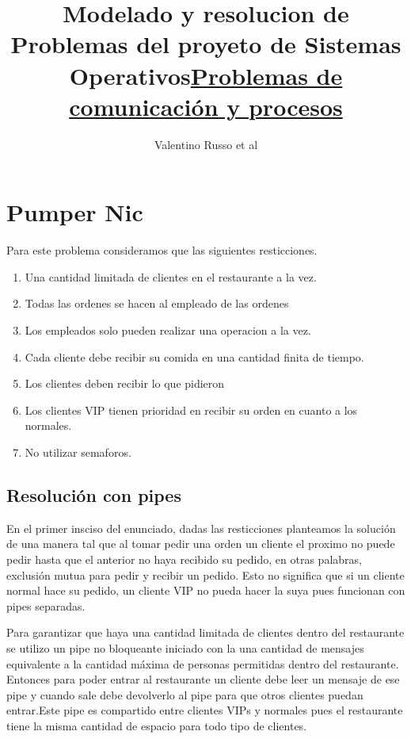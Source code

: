 \documentclass[11pt]{article} %
\title{\huge Modelado y resolucion de Problemas del proyeto de Sistemas Operativos}
\author{Valentino Russo et al}
\date{} %
\begin{document}
\maketitle

\hfill \break
\title{\huge \underline {Problemas de comunicación y procesos}}

\section{Pumper Nic}

Para este problema consideramos que las siguientes resticciones.
\begin{enumerate}
    \item Una cantidad limitada de clientes en el restaurante a la vez.
    \item Todas las ordenes se hacen al empleado de las ordenes
    \item Los empleados solo pueden realizar una operacion a la vez.
    \item Cada cliente debe recibir su comida en una cantidad finita de tiempo.
    \item Los clientes deben recibir lo que pidieron
    \item Los clientes VIP tienen prioridad en recibir su orden en cuanto a los normales.
    \item No utilizar semaforos.
\end{enumerate}
\subsection{Resolución con pipes}
    En el primer insciso del enunciado, dadas las resticciones planteamos la solución de una manera tal que al tomar pedir una orden un cliente el proximo no puede pedir hasta que el anterior no haya recibido su pedido, en otras palabras, exclusión mutua para pedir y recibir un pedido. Esto no significa que si un cliente normal hace su pedido, un cliente VIP no pueda hacer la suya pues funcionan con pipes separadas.

    Para garantizar que haya una cantidad limitada de clientes dentro del restaurante se utilizo un pipe no bloqueante iniciado con la una cantidad de mensajes equivalente a la cantidad máxima de personas permitidas dentro del restaurante. Entonces para poder entrar al restaurante un cliente debe leer un mensaje de ese pipe y cuando sale debe devolverlo al pipe para que otros clientes puedan entrar.Este pipe es compartido entre clientes VIPs y normales pues el restaurante tiene la misma cantidad de espacio para todo tipo de clientes.
\end{document}
